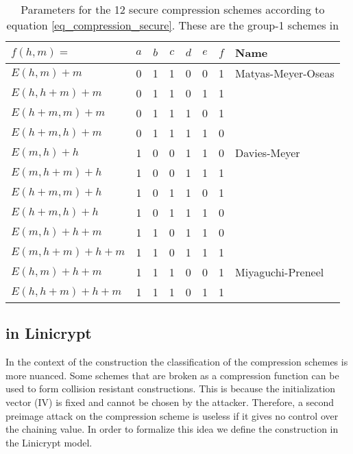 \begin{table}[]
\centering
\renewcommand{\arraystretch}{1.2}
\begin{tabular}{l|cccccc|l}
\toprule
    $f(h,m)=$  & $a$ & $b$ & $c$ & $d$ & $e$ & $f$ & Name \\
    \midrule
    $E(h,m)   +m$    & 0 & 1 & 1 & 0 & 0 & 1 & Matyas-Meyer-Oseas \\
    $E(h,h+m) +m$    & 0 & 1 & 1 & 0 & 1 & 1 &  \\
    $E(h+m,m) +m$    & 0 & 1 & 1 & 1 & 0 & 1 &  \\
    $E(h+m,h) +m$    & 0 & 1 & 1 & 1 & 1 & 0 &  \\
    $E(m,h)   +h$    & 1 & 0 & 0 & 1 & 1 & 0 & Davies-Meyer \\
    $E(m,h+m) +h$    & 1 & 0 & 0 & 1 & 1 & 1 &  \\
    $E(h+m,m) +h$    & 1 & 0 & 1 & 1 & 0 & 1 &  \\
    $E(h+m,h) +h$    & 1 & 0 & 1 & 1 & 1 & 0 &  \\
    $E(m,h)   +h+m$  & 1 & 1 & 0 & 1 & 1 & 0 &  \\
    $E(m,h+m) +h+m$  & 1 & 1 & 0 & 1 & 1 & 1 &  \\
    $E(h,m)   +h+m$  & 1 & 1 & 1 & 0 & 0 & 1 & Miyaguchi-Preneel \\
    $E(h,h+m) +h+m$  & 1 & 1 & 1 & 0 & 1 & 1 &  \\
\hline
\bottomrule
\end{tabular}
\caption{Parameters for the 12 secure compression schemes according to equation \eqref{eq_compression_secure}.
    These are the group-1 schemes in \cite{C:BlaRogShr02}}
\label{table_12_secure_compression_schemes}
\end{table}

\subsection{\MD in Linicrypt}

In the context of the \MD construction the classification of the compression schemes is more nuanced.
Some schemes that are broken as a compression function can be used to form collision resistant \MD constructions.
This is because the initialization vector (IV) is fixed and cannot be chosen by the attacker.
Therefore, a second preimage attack on the compression scheme is useless if it gives no control over the chaining value.
In order to formalize this idea we define the \MD construction in the Linicrypt model.


